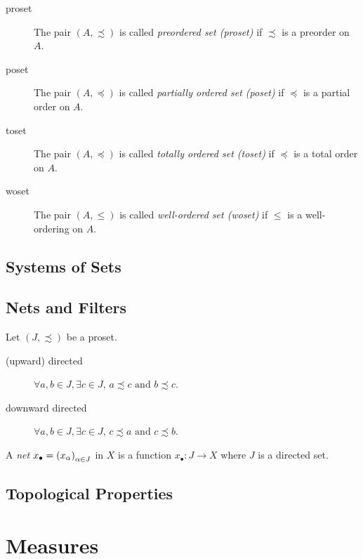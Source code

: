\begin{description}
    \item[proset] The pair \((A,\precsim) \) is called \emph{preordered set (proset)} if \(\precsim \) is a preorder on \(A\).
    \item[poset] The pair \((A,\preccurlyeq)\) is called \emph{partially ordered set (poset)} if \(\preceq\) is a partial order on \(A\).
    \item[toset] The pair \((A,\preceq)\) is called \emph{totally ordered set (toset)} if \(\preceq\) is a total order on \(A\).
    \item[woset] The pair \((A,\le)\) is called \emph{well-ordered set (woset)} if \(\le\) is a well-ordering on \(A\).
\end{description}

\section{Systems of Sets}

\section{Nets and Filters}

\begin{definition} Let \((J, \precsim)\) be a proset.
    \begin{description}
        \item[(upward) directed] \(\forall a,b \in J,\exists c \in J,\, a\precsim c \mbox{ and } b \precsim c \).
        \item[downward directed] \(\forall a,b \in J,\exists c \in J,\, c \precsim a \mbox{ and } c \precsim b\).
    \end{description}
\end{definition}

\begin{definition}
    A \emph{net} \(x_\bullet = \Net \) in \(X\) is a function \(x_\bullet: J \to X\) where \(J\) is a directed set. 
\end{definition}


\section{Topological Properties}

\chapter{Measures}

